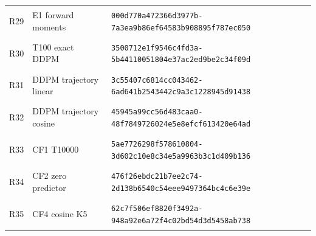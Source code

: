 \begin{longtable}{@{}l>{\raggedright\arraybackslash}p{3.5cm}p{10.8cm}@{}}
\hypertarget{R29}{R29} & E1 forward moments & {\fontsize{8.8}{11}\selectfont\texttt{000d770a472366d3977b-7a3ea9b86ef64583b908895f787ec050}} \\
\hypertarget{R30}{R30} & T100 exact DDPM & {\fontsize{8.8}{11}\selectfont\texttt{3500712e1f9546c4fd3a-5b44110051804e37ac2ed9be2c34f09d}} \\
\hypertarget{R31}{R31} & DDPM trajectory linear & {\fontsize{8.8}{11}\selectfont\texttt{3c55407c6814cc043462-6ad641b2543442c9a3c1228945d91438}} \\
\hypertarget{R32}{R32} & DDPM trajectory cosine & {\fontsize{8.8}{11}\selectfont\texttt{45945a99cc56d483caa0-48f7849726024e5e8efcf613420e64ad}} \\
\hypertarget{R33}{R33} & CF1 T10000 & {\fontsize{8.8}{11}\selectfont\texttt{5ae7726298f578610804-3d602c10e8c34e5a9963b3c1d409b136}} \\
\hypertarget{R34}{R34} & CF2 zero predictor & {\fontsize{8.8}{11}\selectfont\texttt{476f26ebdc21b7ee2c74-2d138b6540c54eee9497364bc4c6e39e}} \\
\hypertarget{R35}{R35} & CF4 cosine K5 & {\fontsize{8.8}{11}\selectfont\texttt{62c7f506ef8820f3492a-948a92e6a72f4c02bd54d3d5458ab738}} \\
\bottomrule\end{longtable}\endgroup
